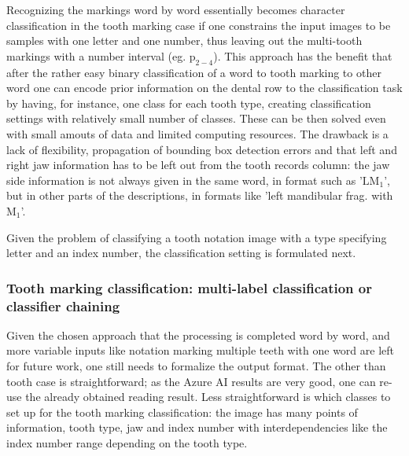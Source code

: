 \documentclass{article}
\begin{document}

Recognizing the markings word by word essentially becomes character classification in 
the tooth marking case if one constrains the input images to be samples with one letter and 
one number, thus leaving out the multi-tooth markings with a number interval (eg. $\text{p}_{2-4}$).
This approach has the benefit that after the rather easy binary classification of a word to 
tooth marking to other word one can encode prior information on the dental row to the classification
task by having, for instance, one class for each tooth type, creating classification settings 
with relatively small number of classes. These can be then solved even with small amouts of 
data and limited computing resources. The drawback is a lack of flexibility, propagation of 
bounding box detection errors and that left and right jaw information has to be left out from 
the tooth records column: the jaw side information is not always given in the same word, 
in format such as '$\text{LM}_1$', but in other parts of the descriptions, in formats like 'left mandibular frag. with $\text{M}_1$'.

Given the problem of classifying a tooth notation image with a type specifying letter and an index 
number, the classification setting is formulated next.

\subsubsection{Tooth marking classification: multi-label classification or classifier chaining}

Given the chosen approach that the processing is completed word by word, and more variable inputs like 
notation marking multiple teeth with one word are left for future work, one still needs to formalize the 
output format. The other than tooth case is straightforward; as the Azure AI results are very good, one 
can re-use the already obtained reading result. Less straightforward is which classes to set up for the 
tooth marking classification: the image has many points of information, tooth type, jaw and index number with 
interdependencies like the index number range depending on the tooth type.
\end{document}
